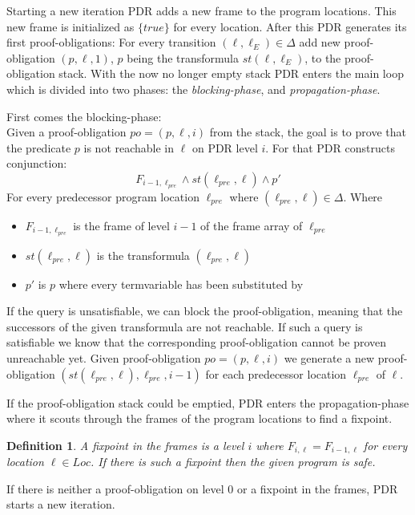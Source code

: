 \documentclass{article}
\newtheorem{mydef}{Definition}
\begin{document}
	Starting a new iteration PDR adds a new frame to the program locations. This new frame is initialized as $\{true\}$ for every location. After this PDR generates its first proof-obligations: For every transition $(\ell, \ell_E) \in \Delta$ add new proof-obligation $(p, \ell, 1)$, $p$ being the transformula $st(\ell, \ell_E)$, to the proof-obligation stack. With the now no longer empty stack PDR enters the main loop which is divided into two phases: the \textsl{blocking-phase}, and \textsl{propagation-phase}.
	
	\bigskip
	
	First comes the blocking-phase: \\ 
	Given a proof-obligation $po = (p, \ell, i)$ from the stack, the goal is to prove that the predicate $p$ is not reachable in $\ell$ on PDR level $i$. For that PDR constructs conjunction:
	\begin{equation*}
		F_{i - 1, \ell_{pre}} \land st(\ell_{pre}, \ell) \land p'
	\end{equation*}
	For every predecessor program location $\ell_{pre}$ where $(\ell_{pre}, \ell) \in \Delta$. 
	Where 
	\begin{itemize}
		\item $F_{i - 1, \ell_{pre}}$ is the frame of level $i - 1$ of the frame array of $\ell_{pre}$
		\item $st(\ell_{pre}, \ell)$ is the transformula $(\ell_{pre}, \ell)$
		\item $p'$ is $p$ where every termvariable has been substituted by 
		
	\end{itemize}
	If the query is unsatisfiable, we can block the proof-obligation, meaning that the successors of the given transformula are not reachable.
	If such a query is satisfiable we know that the corresponding proof-obligation cannot be proven unreachable yet. Given proof-obligation  $po = (p, \ell, i)$ we generate a new proof-obligation $(st(\ell_{pre}, \ell), \ell_{pre}, i-1) $ for each predecessor location $\ell_{pre}$ of $\ell$.
	
	\bigskip
	
	If the proof-obligation stack could be emptied, PDR enters the propagation-phase where it scouts through the frames of the program locations to find a fixpoint. \\
	\begin{mydef}
		A fixpoint in the frames is a level $i$ where $F_{i, \ell} = F_{i-1, \ell}$ for every location $\ell \in Loc$. If there is such a fixpoint then the given program is safe.
	\end{mydef}
	If there is neither a proof-obligation on level 0 or a fixpoint in the frames, PDR starts a new iteration.
	
\end{document}
